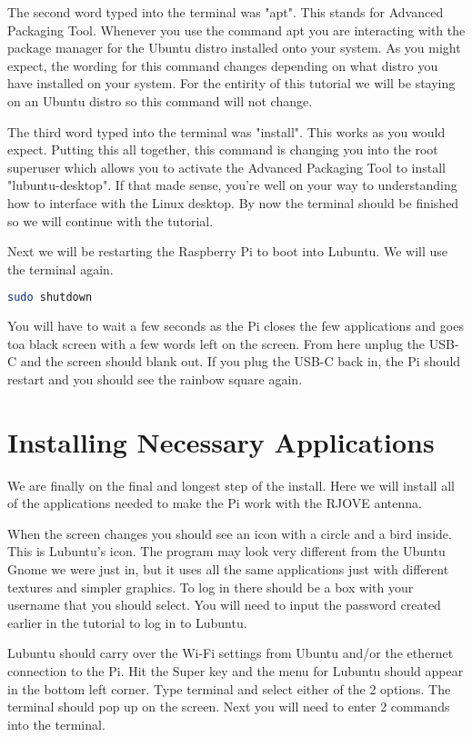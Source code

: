 \documentclass[letterpaper,12pt,notitlepage]{report} %
\begin{document}
The second word typed into the terminal was "apt". This stands for Advanced Packaging Tool. Whenever you use the command apt you are interacting with the package manager for the Ubuntu distro installed onto your system. As you might expect, the wording for this command changes depending on what distro you have installed on your system. For the entirity of this tutorial we will be staying on an Ubuntu distro so this command will not change. 

The third word typed into the terminal was "install". This works as you would expect. Putting this all together, this command is changing you into the root superuser which allows you to activate the Advanced Packaging Tool to install "lubuntu-desktop". If that made sense, you're well on your way to understanding how to interface with the Linux desktop. By now the terminal should be finished so we will continue with the tutorial.

Next we will be restarting the Raspberry Pi to boot into Lubuntu. We will use the terminal again.

\begin{lstlisting}[language=bash]
	sudo shutdown
\end{lstlisting}

You will have to wait a few seconds as the Pi closes the few applications and goes toa black screen with a few words left on the screen. From here unplug the USB-C and the screen should blank out. If you plug the USB-C back in, the Pi should restart and you should see the rainbow square again.

\section{Installing Necessary Applications}

We are finally on the final and longest step of the install. Here we will install all of the applications needed to make the Pi work with the RJOVE antenna. 

When the screen changes you should see an icon with a circle and a bird inside. This is Lubuntu's icon. The program may look very different from the Ubuntu Gnome we were just in, but it uses all the same applications just with different textures and simpler graphics. To log in there should be a box with your username that you should select. You will need to input the password created earlier in the tutorial to log in to Lubuntu. 

Lubuntu should carry over the Wi-Fi settings from Ubuntu and/or the ethernet connection to the Pi. Hit the Super key and the menu for Lubuntu should appear in the bottom left corner. Type terminal and select either of the 2 options. The terminal should pop up on the screen. Next you will need to enter 2 commands into the terminal.
\end{document}
